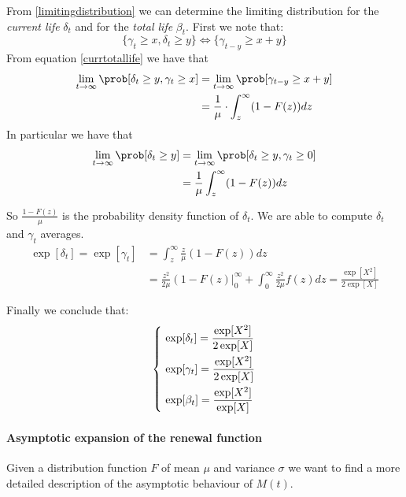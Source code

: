 From \ref{limitingdistribution} we can determine the limiting distribution for the \textit{current life} $\delta_t$ and for the \textit{total life} $\beta_t$. First we note that:
\begin{equation} \label{currtotallife}
	\{\gamma_t \geq x, \delta_t \geq y \}
	\Leftrightarrow
	\{\gamma_{t-y} \geq x+y \}
\end{equation}
From equation \ref{currtotallife} we have that
\begin{align*}
	\lim_{t \rightarrow \infty} \prob[\delta_t \geq y, \gamma_t \geq x] & = \lim_{t \rightarrow \infty} \prob[\gamma_{t-y} \geq x+y] \\ & = \frac{1}{\mu} \cdot \int_z^{\infty}(1-F(z))dz
\end{align*}
In particular we have that
\begin{align*}
	\lim_{t \rightarrow \infty} \prob[\delta_t \geq y] & = \lim_{t \rightarrow \infty} \prob[\delta_t \geq y, \gamma_{t} \geq 0] \\ & = \frac{1}{\mu} \int_z^{\infty}(1-F(z))dz
\end{align*}

So $\frac{1-F(z)}{\mu}$ is the probability density function of $\delta_t$. We are able to compute $\delta_t$ and $\gamma_t$ averages.
\begin{align*}
	\exp[\delta_t]=\exp[\gamma_t] & =\int_z^{\infty} \frac{z}{\mu} (1-F(z))dz \\ & = \frac{z^2}{2\mu} \left( 1-F(z) \right|_0^{\infty} + \int_0^{\infty}\frac{z^2}{2 \mu} f(z)dz= \frac{\exp[X^2]}{2 \exp[X]}
\end{align*}

Finally we conclude that:
\begin{equation*}
	\begin{dcases}
		~ \exp[\delta_t] = \frac{\exp[X^2]}{2 \exp[X]} \\
		~ \exp[\gamma_t] = \frac{\exp[X^2]}{2 \exp[X]} \\
		~ \exp[\beta_t] = \frac{\exp[X^2]}{\exp[X]}
	\end{dcases}
\end{equation*}


\paragraph{Asymptotic expansion of the renewal function}
Given a distribution function $F$ of mean $\mu$ and variance $\sigma$ we want to find a more detailed description of the asymptotic behaviour of $M(t)$.

